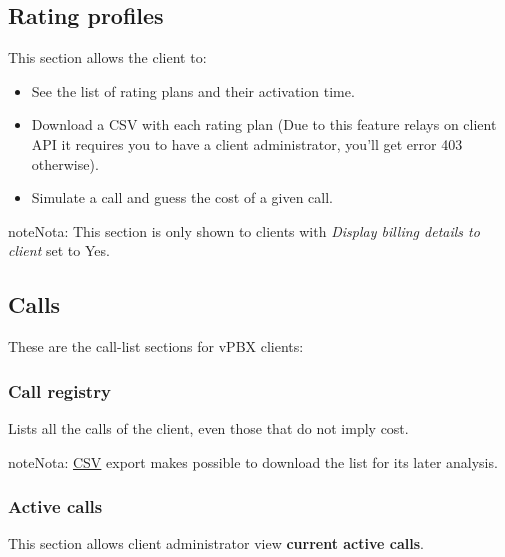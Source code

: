\documentclass[letterpaper,10pt,spanish]{sphinxmanual}
\begin{document}
\subsection{Rating profiles}
\label{administration_portal/client/vpbx/rating_profiles:rating-profiles}\label{administration_portal/client/vpbx/rating_profiles::doc}
This section allows the client to:
\begin{itemize}
\item {} 
See the list of rating plans and their activation time.

\item {} 
Download a CSV with each rating plan (Due to this feature relays on client API it requires you to have a client administrator, you'll get error 403 otherwise).

\item {} 
Simulate a call and guess the cost of a given call.

\end{itemize}

\begin{notice}{note}{Nota:}
This section is only shown to clients with \emph{Display billing details to client} set to Yes.
\end{notice}


\subsection{Calls}
\label{administration_portal/client/vpbx/calls/index::doc}\label{administration_portal/client/vpbx/calls/index:calls}
These are the call-list sections for vPBX clients:


\subsubsection{Call registry}
\label{administration_portal/client/vpbx/calls/call_registry::doc}\label{administration_portal/client/vpbx/calls/call_registry:call-registry}\label{administration_portal/client/vpbx/calls/call_registry:id1}
Lists all the calls of the client, even those that do not imply cost.

\begin{notice}{note}{Nota:}
\href{https://es.wikipedia.org/wiki/CSV}{CSV} export makes possible to
download the list for its later analysis.
\end{notice}


\subsubsection{Active calls}
\label{administration_portal/client/vpbx/calls/active_calls::doc}\label{administration_portal/client/vpbx/calls/active_calls:active-calls}
This section allows client administrator view \textbf{current active calls}.
\end{document}
